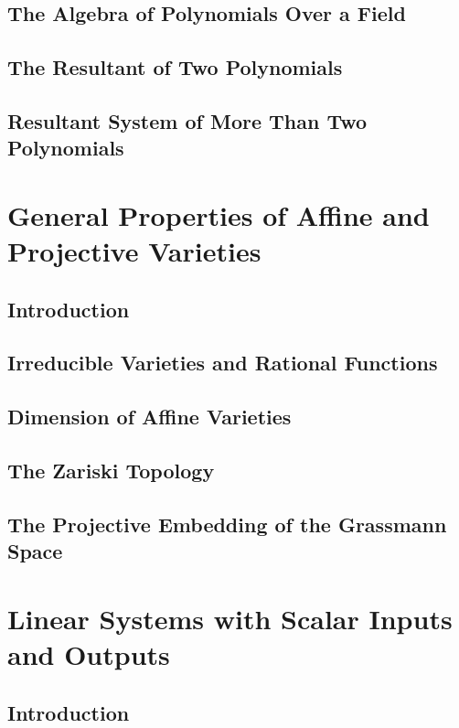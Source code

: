 \documentclass[12pt]{book}
\theoremstyle{plain}
\theoremstyle{definition}
\begin{document}
\section{The Algebra of Polynomials Over a Field}

\section{The Resultant of Two Polynomials}

\section{Resultant System of More Than Two Polynomials}

\chapter{General Properties of Affine and Projective Varieties}

\section{Introduction}

\section{Irreducible Varieties and Rational Functions}

\section{Dimension of Affine Varieties}

\section{The Zariski Topology}

\section{The Projective Embedding of the Grassmann Space}

\chapter{Linear Systems with Scalar Inputs and Outputs}

\section{Introduction}
\end{document}
